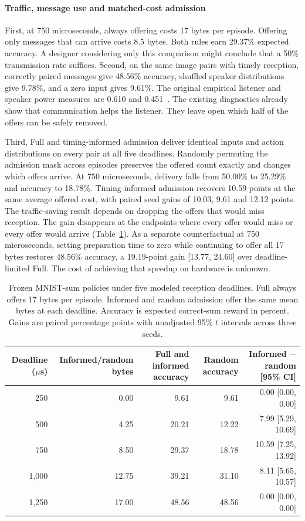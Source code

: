 \documentclass[a4paper,fleqn]{cas-dc}
\begin{document}
\paragraph{Traffic, message use and matched-cost admission}
First, at 750 microseconds, always offering costs 17 bytes per episode. Offering only messages that can arrive costs 8.5 bytes. Both rules earn 29.37\% expected accuracy. A designer considering only this comparison might conclude that a 50\% transmission rate suffices. Second, on the same image pairs with timely reception, correctly paired messages give 48.56\% accuracy, shuffled speaker distributions give 9.78\%, and a zero input gives 9.61\%. The original empirical listener and speaker power measures are 0.610 and 0.451~\citep{eccles2019biases}. The existing diagnostics already show that communication helps the listener. They leave open which half of the offers can be safely removed.

Third, Full and timing-informed admission deliver identical inputs and action distributions on every pair at all five deadlines. Randomly permuting the admission mask across episodes preserves the offered count exactly and changes which offers arrive. At 750 microseconds, delivery falls from 50.00\% to 25.29\% and accuracy to 18.78\%. Timing-informed admission recovers 10.59 points at the same average offered cost, with paired seed gains of 10.03, 9.61 and 12.12 points. The traffic-saving result depends on dropping the offers that would miss reception. The gain disappears at the endpoints where every offer would miss or every offer would arrive (Table~\ref{tab:external_deadlines}). As a separate counterfactual at 750 microseconds, setting preparation time to zero while continuing to offer all 17 bytes restores 48.56\% accuracy, a 19.19-point gain [13.77, 24.60] over deadline-limited Full. The cost of achieving that speedup on hardware is unknown.

\begin{table}[pos=t]\centering\small
\caption{Frozen MNIST-sum policies under five modeled reception deadlines. Full always offers 17 bytes per episode. Informed and random admission offer the same mean bytes at each deadline. Accuracy is expected correct-sum reward in percent. Gains are paired percentage points with unadjusted 95\% $t$ intervals across three seeds.}\label{tab:external_deadlines}
\begin{tabular}{rrrrr}\toprule
Deadline ($\mu$s) & Informed/random bytes & Full and informed accuracy & Random accuracy & Informed $-$ random [95\% CI]\\\midrule
250 & 0.00 & 9.61 & 9.61 & 0.00 [0.00, 0.00]\\
500 & 4.25 & 20.21 & 12.22 & 7.99 [5.29, 10.69]\\
750 & 8.50 & 29.37 & 18.78 & 10.59 [7.25, 13.92]\\
1,000 & 12.75 & 39.21 & 31.10 & 8.11 [5.65, 10.57]\\
1,250 & 17.00 & 48.56 & 48.56 & 0.00 [0.00, 0.00]\\
\bottomrule\end{tabular}\end{table}
\end{document}
